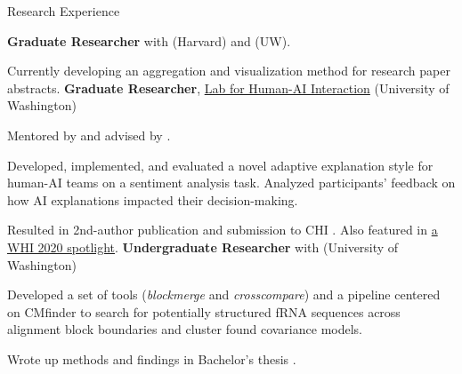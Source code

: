\begin{rubric}{Research Experience}

	\textbf{Graduate Researcher} with \pGlassmanE{} (Harvard) and \pWeldD{} (UW).
	\par Currently developing an aggregation and visualization method for research paper abstracts.
	\textbf{Graduate Researcher}, \href{http://hai.cs.washington.edu}{Lab for Human-AI Interaction} (University of Washington)
	\par Mentored by \pBansalG{} and advised by \pWeldD{}.
	\par Developed, implemented, and evaluated a novel adaptive explanation style for human-AI teams on a sentiment analysis task. Analyzed participants' feedback on how AI explanations impacted their decision-making.
	\par Resulted in 2nd-author publication and submission to CHI \cite{bansal2021does}. Also featured in \href{https://sites.google.com/view/whi2020/home}{a WHI 2020 spotlight}.
\entry*[2018 -- 2019] %
    \textbf{Undergraduate Researcher} with \pRuzzoL{} (University of Washington)
    \par Developed a set of tools (\textit{blockmerge} and \textit{crosscompare}) and a pipeline centered on CMfinder to search for potentially structured fRNA sequences across alignment block boundaries and cluster found covariance models.
    \par Wrote up methods and findings in Bachelor's thesis \cite{zhou2019thesis}.
\end{rubric}